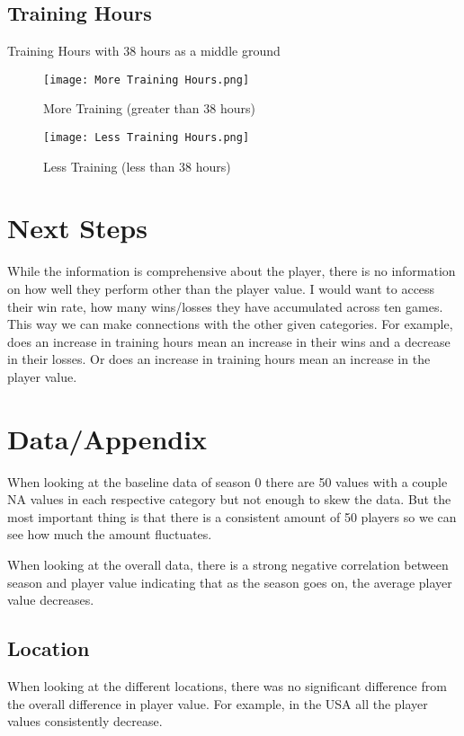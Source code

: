 \documentclass{exam}
\begin{document}
\subsection{Training Hours}
Training Hours with 38 hours as a middle ground

\begin{figure}[h]
  \centering
  \begin{minipage}[b]{0.45\textwidth}
    \texttt{[image: More Training Hours.png]}
    \caption{More Training (greater than 38 hours)}
  \end{minipage}
  \hfill
  \begin{minipage}[b]{0.45\textwidth}
    \texttt{[image: Less Training Hours.png]}
    \caption{Less Training (less than 38 hours)}
  \end{minipage}
\end{figure}


\section{Next Steps}
While the information is comprehensive about the player, there is no information on how well they perform other than the player value. I would want to access their win rate, how many wins/losses they have accumulated across ten games. This way we can make connections with the other given categories. For example, does an increase in training hours mean an increase in their wins and a decrease in their losses. Or does an increase in training hours mean an increase in the player value.

\section{Data/Appendix}
When looking at the baseline data of season 0 there are 50 values with a couple NA values in each respective category but not enough to skew the data. But the most important thing is that there is a consistent amount of 50 players so we can see how much the amount fluctuates.

When looking at the overall data, there is a strong negative correlation between season and player value indicating that as the season goes on, the average player value decreases. 


\subsection{Location}
When looking at the different locations, there was no significant difference from the overall difference in player value. For example, in the USA all the player values consistently decrease.
\end{document}
